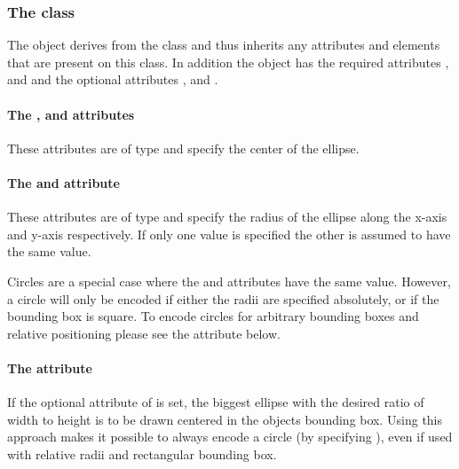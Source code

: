 \subsubsection{The  class}
\label{renderellipse-class}


The \RenderEllipse object derives from the \GraphicalPrimitiveTwoD class
and thus inherits any attributes and elements that are present on this
class.
In addition the \RenderEllipse object has the required attributes , 
 and  and the optional attributes ,  and .

\paragraph{The \fixttspace{}, \fixttspace{} and \fixttspace{}  attributes}

These attributes are of type
\RelAbsVector and specify the center of the ellipse.

\paragraph{The \fixttspace{} and \fixttspace{} attribute}

These attributes are of type
\RelAbsVector and specify the radius of the ellipse along the x-axis and y-axis 
respectively. If only one value is specified the other is assumed to have the same value. 

Circles are a special case where the  and  attributes have the same value. However, 
a circle will only be encoded if either the radii are specified absolutely, or if the bounding box is square. 
To encode circles for arbitrary bounding boxes and relative positioning please see the  
attribute below.

\paragraph{The \fixttspace{} attribute}
If the optional  attribute of  is set, the biggest 
ellipse with the desired ratio of width to height is to be drawn centered in the 
objects bounding box. Using this approach makes it possible to always encode a 
circle (by specifying ), even if used with relative radii and 
rectangular bounding box. 

